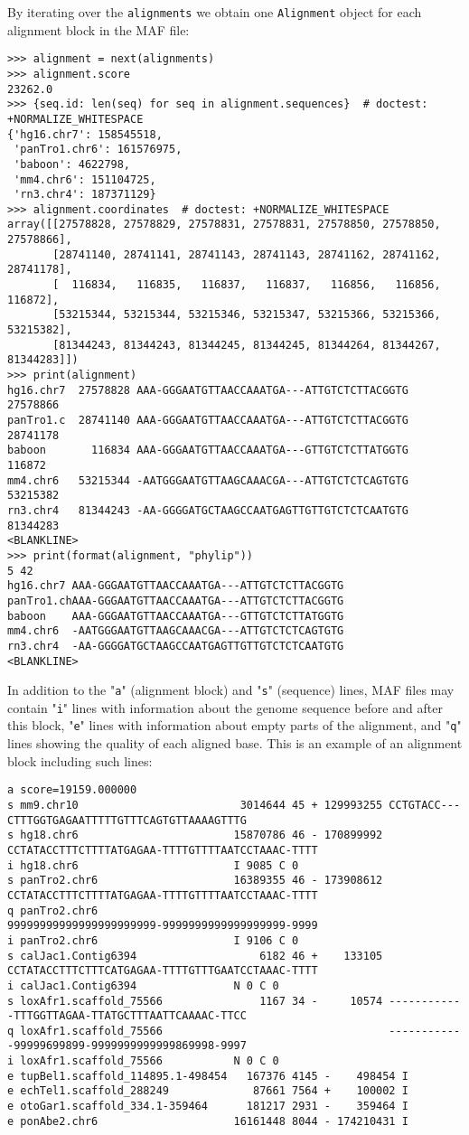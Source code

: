 By iterating over the \verb|alignments| we obtain one \verb|Alignment| object for each alignment block in the MAF file:
\begin{verbatim}
>>> alignment = next(alignments)
>>> alignment.score
23262.0
>>> {seq.id: len(seq) for seq in alignment.sequences}  # doctest: +NORMALIZE_WHITESPACE
{'hg16.chr7': 158545518,
 'panTro1.chr6': 161576975,
 'baboon': 4622798,
 'mm4.chr6': 151104725,
 'rn3.chr4': 187371129}
>>> alignment.coordinates  # doctest: +NORMALIZE_WHITESPACE
array([[27578828, 27578829, 27578831, 27578831, 27578850, 27578850, 27578866],
       [28741140, 28741141, 28741143, 28741143, 28741162, 28741162, 28741178],
       [  116834,   116835,   116837,   116837,   116856,   116856, 116872],
       [53215344, 53215344, 53215346, 53215347, 53215366, 53215366, 53215382],
       [81344243, 81344243, 81344245, 81344245, 81344264, 81344267, 81344283]])
>>> print(alignment)
hg16.chr7  27578828 AAA-GGGAATGTTAACCAAATGA---ATTGTCTCTTACGGTG 27578866
panTro1.c  28741140 AAA-GGGAATGTTAACCAAATGA---ATTGTCTCTTACGGTG 28741178
baboon       116834 AAA-GGGAATGTTAACCAAATGA---GTTGTCTCTTATGGTG   116872
mm4.chr6   53215344 -AATGGGAATGTTAAGCAAACGA---ATTGTCTCTCAGTGTG 53215382
rn3.chr4   81344243 -AA-GGGGATGCTAAGCCAATGAGTTGTTGTCTCTCAATGTG 81344283
<BLANKLINE>
>>> print(format(alignment, "phylip"))
5 42
hg16.chr7 AAA-GGGAATGTTAACCAAATGA---ATTGTCTCTTACGGTG
panTro1.chAAA-GGGAATGTTAACCAAATGA---ATTGTCTCTTACGGTG
baboon    AAA-GGGAATGTTAACCAAATGA---GTTGTCTCTTATGGTG
mm4.chr6  -AATGGGAATGTTAAGCAAACGA---ATTGTCTCTCAGTGTG
rn3.chr4  -AA-GGGGATGCTAAGCCAATGAGTTGTTGTCTCTCAATGTG
<BLANKLINE>
\end{verbatim}
In addition to the "\verb|a|" (alignment block) and "\verb|s|" (sequence) lines, MAF files may contain "\verb|i|" lines with information about the genome sequence before and after this block, "\verb|e|" lines with information about empty parts of the alignment, and "\verb|q|" lines showing the quality of each aligned base. This is an example of an alignment block including such lines:
\begin{verbatim}
a score=19159.000000
s mm9.chr10                         3014644 45 + 129993255 CCTGTACC---CTTTGGTGAGAATTTTTGTTTCAGTGTTAAAAGTTTG
s hg18.chr6                        15870786 46 - 170899992 CCTATACCTTTCTTTTATGAGAA-TTTTGTTTTAATCCTAAAC-TTTT
i hg18.chr6                        I 9085 C 0
s panTro2.chr6                     16389355 46 - 173908612 CCTATACCTTTCTTTTATGAGAA-TTTTGTTTTAATCCTAAAC-TTTT
q panTro2.chr6                                             99999999999999999999999-9999999999999999999-9999
i panTro2.chr6                     I 9106 C 0
s calJac1.Contig6394                   6182 46 +    133105 CCTATACCTTTCTTTCATGAGAA-TTTTGTTTGAATCCTAAAC-TTTT
i calJac1.Contig6394               N 0 C 0
s loxAfr1.scaffold_75566               1167 34 -     10574 ------------TTTGGTTAGAA-TTATGCTTTAATTCAAAAC-TTCC
q loxAfr1.scaffold_75566                                   ------------99999699899-9999999999999869998-9997
i loxAfr1.scaffold_75566           N 0 C 0
e tupBel1.scaffold_114895.1-498454   167376 4145 -    498454 I
e echTel1.scaffold_288249             87661 7564 +    100002 I
e otoGar1.scaffold_334.1-359464      181217 2931 -    359464 I
e ponAbe2.chr6                     16161448 8044 - 174210431 I
\end{verbatim}
